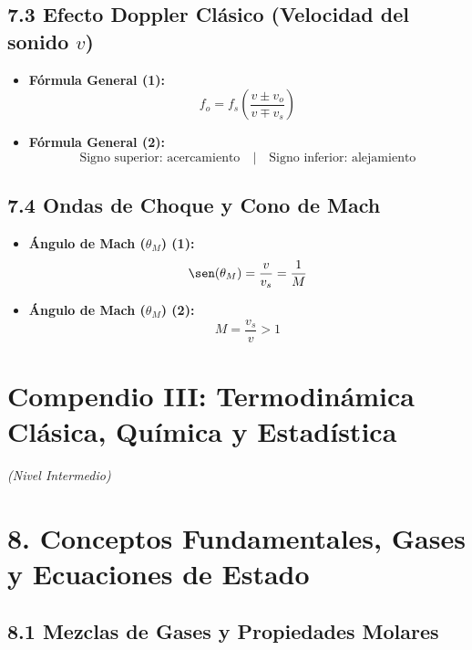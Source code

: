 \documentclass[11pt,a4paper]{article}
\begin{document}
\subsection*{7.3 Efecto Doppler Clásico (Velocidad del sonido $v$)}

\begin{itemize}
  \item \textbf{Fórmula General (1):}
  \[
    f_o = f_s \left( \frac{v \pm v_o}{v \mp v_s} \right)
  \]
  \item \textbf{Fórmula General (2):}
  \[
    \text{Signo superior: acercamiento} \quad | \quad \text{Signo inferior: alejamiento}
  \]
\end{itemize}

\subsection*{7.4 Ondas de Choque y Cono de Mach}

\begin{itemize}
  \item \textbf{Ángulo de Mach ($\theta_M$) (1):}
  \[
    \sen(\theta_M) = \frac{v}{v_s} = \frac{1}{M}
  \]
  \item \textbf{Ángulo de Mach ($\theta_M$) (2):}
  \[
    M = \frac{v_s}{v} > 1
  \]
\end{itemize}

\section*{Compendio III: Termodinámica Clásica, Química y Estadística}

\textit{(Nivel Intermedio)}

\section*{8. Conceptos Fundamentales, Gases y Ecuaciones de Estado}

\subsection*{8.1 Mezclas de Gases y Propiedades Molares}
\end{document}
